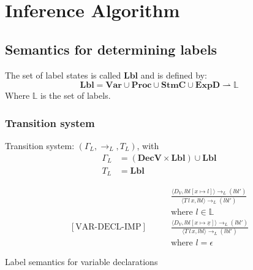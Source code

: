 
\newcommand{\iVar}{\mathbf{Var}}
\newcommand{\iProc}{\mathbf{Proc}}
\newcommand{\iDecv}{\mathbf{DecV}}
\newcommand{\iDecp}{\mathbf{DecP}}
\newcommand{\iStmc}{\mathbf{StmC}}
\newcommand{\iExpd}{\mathbf{ExpD}}
\newcommand{\iLbl}{\mathbf{Lbl}}

\newcommand{\trtspc}{\hspace{2em}} %

\section{Inference Algorithm}

\subsection{Semantics for determining labels}
The set of label states is called $\iLbl$ and is defined by:
\[
  \iLbl = \iVar \cup \iProc \cup \iStmc \cup \iExpd \rightharpoonup \mathbb{L}
\]
Where $\mathbb{L}$ is the set of labels.

\subsubsection{Transition system}
Transition system: $(\Gamma_L, \rightarrow_L, T_L)$, with
\begin{align*}
  \Gamma_L & = (\iDecv \times \iLbl) \cup \iLbl \\
  T_L & = \iLbl
\end{align*}

\begin{table}
\begin{align*}
  [\text{VAR-DECL-EXP}] \trtspc & \frac{
    \langle D_V, lbl[x \mapsto l] \rangle \rightarrow_L (lbl')
  }{
    \langle T \, l \, x, lbl \rangle \rightarrow_L (lbl')
  }\\
  & \text{where } l \in \mathbb{L}\\[2em]
  [\text{VAR-DECL-IMP}] \trtspc & \frac{
    \langle D_V, lbl[x \mapsto \underline{x}] \rangle \rightarrow_L (lbl')
  }{
    \langle T \, l \, x, lbl \rangle \rightarrow_L (lbl')
  }\\
  & \text{where } l = \epsilon
\end{align*}
\caption{Label semantics for variable declarations}
\end{table}


